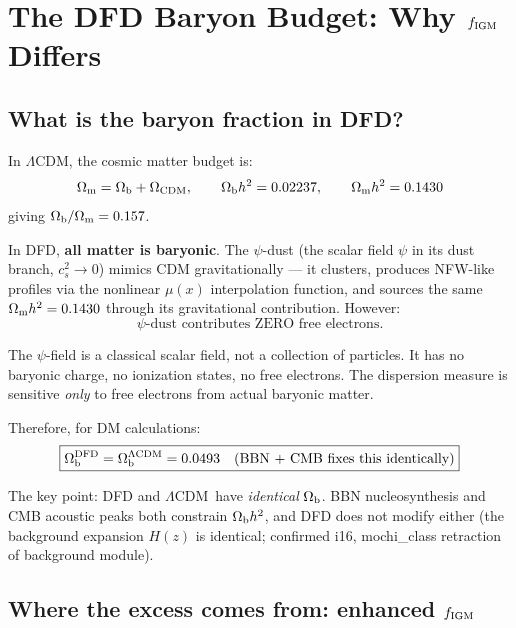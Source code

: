 \documentclass[11pt]{article}
\newcommand{\LCDM}{$\Lambda$CDM}
\newcommand{\Ob}{\Omega_{\rm b}}
\newcommand{\Om}{\Omega_{\rm m}}
\newcommand{\fIGM}{f_{\rm IGM}}
\begin{document}
\section{The DFD Baryon Budget: Why $\fIGM$ Differs}
\label{sec:baryon-budget}

\subsection{What is the baryon fraction in DFD?}

In \LCDM, the cosmic matter budget is:
\begin{equation}
\Om = \Ob + \Omega_{\rm CDM}, \qquad
\Ob h^2 = 0.02237, \qquad
\Om h^2 = 0.1430
\end{equation}
giving $\Ob/\Om = 0.157$.

In DFD, \textbf{all matter is baryonic}.  The $\psi$-dust (the
scalar field $\psi$ in its dust branch, $c_s^2 \to 0$) mimics CDM
gravitationally --- it clusters, produces NFW-like profiles via the
nonlinear $\mu(x)$ interpolation function, and sources the same
$\Om h^2 = 0.1430$ through its gravitational contribution.  However:
\begin{equation}
\boxed{
\text{$\psi$-dust contributes ZERO free electrons.}
}
\end{equation}

The $\psi$-field is a classical scalar field, not a collection of
particles.  It has no baryonic charge, no ionization states, no
free electrons.  The dispersion measure is sensitive \emph{only} to
free electrons from actual baryonic matter.

Therefore, for DM calculations:
\begin{equation}
\boxed{
\Ob^{\rm DFD} = \Ob^{\rm \Lambda CDM} = 0.0493
\quad(\text{BBN + CMB fixes this identically})
}
\end{equation}

The key point: DFD and \LCDM\ have \emph{identical} $\Ob$.  BBN
nucleosynthesis and CMB acoustic peaks both constrain $\Ob h^2$, and
DFD does not modify either (the background expansion $H(z)$ is
identical; confirmed i16, mochi\_class retraction of background module).

\subsection{Where the excess comes from: enhanced $\fIGM$}
\end{document}

